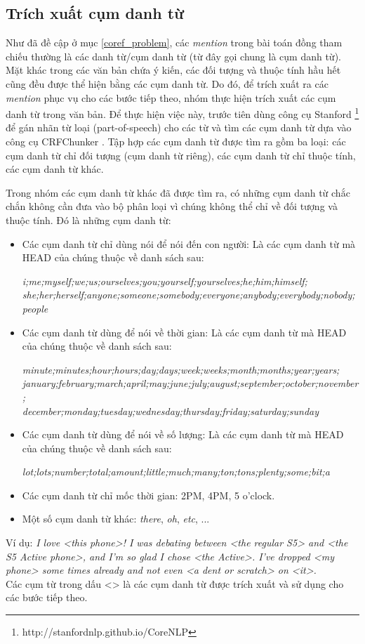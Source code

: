 \documentclass[12pt]{extarticle}
\begin{document}
		\subsection{Trích xuất cụm danh từ}
			\par Như đã đề cập ở mục \ref{coref_problem}, các \textit{mention} trong bài toán đồng tham chiếu thường là các danh từ/cụm danh từ (từ đây gọi chung là cụm danh từ). Mặt khác trong các văn bản chứa ý kiến, các đối tượng và thuộc tính hầu hết cũng đều được thể hiện bằng các cụm danh từ. Do đó, để trích xuất ra các \textit{mention} phục vụ cho các bước tiếp theo, nhóm thực hiện trích xuất các cụm danh từ trong văn bản. Để thực hiện việc này, trước tiên dùng công cụ Stanford \footnote{http://stanfordnlp.github.io/CoreNLP} để gán nhãn từ loại (part-of-speech) cho các từ và tìm các cụm danh từ dựa vào công cụ CRFChunker \cite{crfchunker}. Tập hợp các cụm danh từ được tìm ra gồm ba loại: các cụm danh từ chỉ đối tượng (cụm danh từ riêng), các cụm danh từ chỉ thuộc tính, các cụm danh từ khác.
			\par Trong nhóm các cụm danh từ khác đã được tìm ra, có những cụm danh từ chắc chắn không cần đưa vào bộ phân loại vì chúng không thể chỉ về đối tượng và thuộc tính. Đó là những cụm danh từ:
				\begin{itemize}
					\item{Các cụm danh từ chỉ dùng nói để nói đến con người: Là các cụm danh từ mà HEAD của chúng thuộc về danh sách sau:
					\par \textit{i;me;myself;we;us;ourselves;you;yourself;yourselves;he;him;himself;
					\\she;her;herself;anyone;someone;somebody;everyone;anybody;everybody;nobody;people}}
					\item{Các cụm danh từ dùng để nói về thời gian: Là các cụm danh từ mà HEAD của chúng thuộc về danh sách sau:
					\par \textit{minute;minutes;hour;hours;day;days;week;weeks;month;months;year;years;
					\\january;february;march;april;may;june;july;august;september;october;november;
					\\december;monday;tuesday;wednesday;thursday;friday;saturday;sunday}}
					\item{Các cụm danh từ dùng để nói về số lượng: Là các cụm danh từ mà HEAD của chúng thuộc về danh sách sau:
					\par \textit{lot;lots;number;total;amount;little;much;many;ton;tons;plenty;some;bit;a}}
					\item{Các cụm danh từ chỉ mốc thời gian: 2PM, 4PM, 5 o'clock.}
					\item{Một số cụm danh từ khác: \textit{there}, \textit{oh}, \textit{etc}, ...}					
				\end{itemize}
			\par Ví dụ:
				\textit{I love <this phone>! I was debating between <the regular S5> and <the S5 Active phone>, and I'm so glad I chose <the Active>. I've dropped <my phone> some times already and not even <a dent or scratch> on <it>.}
				\\Các cụm từ trong dấu <> là các cụm danh từ được trích xuất và sử dụng cho các bước tiếp theo.
\end{document}
